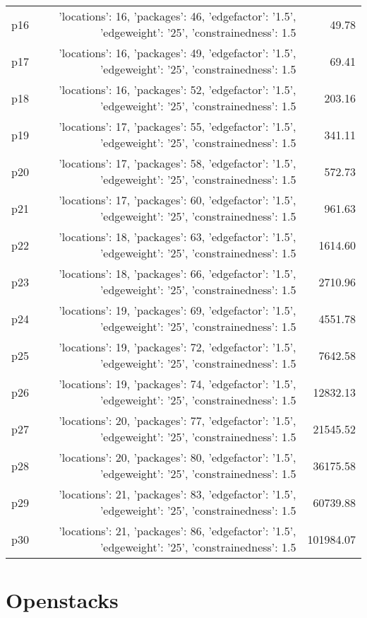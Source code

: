 \documentclass{article}
\begin{document}
\begin{center}
\begin{tabular}{@{}l|r|r@{}}
  p16&{'locations': 16, 'packages': 46, 'edgefactor': '1.5', 'edgeweight': '25', 'constrainedness': 1.5}&49.78\\
  p17&{'locations': 16, 'packages': 49, 'edgefactor': '1.5', 'edgeweight': '25', 'constrainedness': 1.5}&69.41\\
  p18&{'locations': 16, 'packages': 52, 'edgefactor': '1.5', 'edgeweight': '25', 'constrainedness': 1.5}&203.16\\
  p19&{'locations': 17, 'packages': 55, 'edgefactor': '1.5', 'edgeweight': '25', 'constrainedness': 1.5}&341.11\\
  p20&{'locations': 17, 'packages': 58, 'edgefactor': '1.5', 'edgeweight': '25', 'constrainedness': 1.5}&572.73\\
  p21&{'locations': 17, 'packages': 60, 'edgefactor': '1.5', 'edgeweight': '25', 'constrainedness': 1.5}&961.63\\
  p22&{'locations': 18, 'packages': 63, 'edgefactor': '1.5', 'edgeweight': '25', 'constrainedness': 1.5}&1614.60\\
  p23&{'locations': 18, 'packages': 66, 'edgefactor': '1.5', 'edgeweight': '25', 'constrainedness': 1.5}&2710.96\\
  p24&{'locations': 19, 'packages': 69, 'edgefactor': '1.5', 'edgeweight': '25', 'constrainedness': 1.5}&4551.78\\
  p25&{'locations': 19, 'packages': 72, 'edgefactor': '1.5', 'edgeweight': '25', 'constrainedness': 1.5}&7642.58\\
  p26&{'locations': 19, 'packages': 74, 'edgefactor': '1.5', 'edgeweight': '25', 'constrainedness': 1.5}&12832.13\\
  p27&{'locations': 20, 'packages': 77, 'edgefactor': '1.5', 'edgeweight': '25', 'constrainedness': 1.5}&21545.52\\
  p28&{'locations': 20, 'packages': 80, 'edgefactor': '1.5', 'edgeweight': '25', 'constrainedness': 1.5}&36175.58\\
  p29&{'locations': 21, 'packages': 83, 'edgefactor': '1.5', 'edgeweight': '25', 'constrainedness': 1.5}&60739.88\\
  p30&{'locations': 21, 'packages': 86, 'edgefactor': '1.5', 'edgeweight': '25', 'constrainedness': 1.5}&101984.07
                            \end{tabular}
                            \end{center}
                    
                            \newpage \section{Openstacks}
\end{document}
